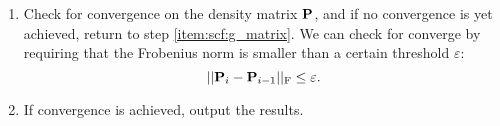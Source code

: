 \documentclass[12pt]{article}
\begin{document}
\begin{enumerate}
        \item Check for convergence on the density matrix $\vb{P}$, and if no convergence is yet achieved, return to step \ref{item:scf:g_matrix}. We can check for converge by requiring that the Frobenius norm is smaller than a certain threshold $\varepsilon$:
        \begin{equation}
            ||\vb{P}_i - \vb{P}_{i-1}||_\text{F} \leq \varepsilon .
        \end{equation}

        \item If convergence is achieved, output the results.
    \end{enumerate}






\end{document}
